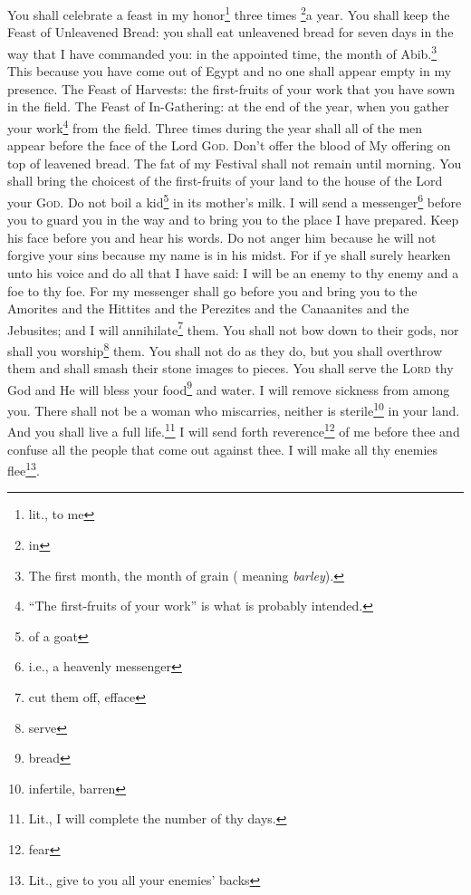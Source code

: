 \begin{enumerate*}[mode=unboxed]
     You shall celebrate a feast in my honor\footnote{lit., to me} three times \footnote{in}a year.%
     You shall keep the Feast of Unleavened Bread: you shall eat unleavened bread for seven days in the way that I have commanded you: in the appointed time, the month of Abib.\footnote{The first month, the month of grain ( meaning \textit{barley}).} This because you have come out of Egypt and no one shall appear empty in my presence.%
     The Feast of Harvests: the first-fruits of your work that you have sown in the field. The Feast of In-Gathering: at the end of the year, when you gather your work\footnote{``The first-fruits of your work'' is what is probably intended.} from the field.%
     Three times during the year shall all of the men appear before the face of the Lord \textsc{God}.%
     Don't offer the blood of My offering on top of leavened bread. The fat of my Festival shall not remain until morning.%
     You shall bring the choicest of the first-fruits of your land to the house of the Lord your \textsc{God}. Do not boil a kid\footnote{of a goat} in its mother's milk.%
     I will send a messenger\footnote{i.e., a heavenly messenger} before you to guard you in the way and to bring you to the place I have prepared.%
     Keep his face before you and hear his words. Do not anger him because he will not forgive your sins because my name is in his midst.%
     For if ye shall surely hearken unto his voice and do all that I have said: I will be an enemy to thy enemy and a foe to thy foe.%
     For my messenger shall go before you and bring you to the Amorites and the Hittites and the Perezites and the Canaanites and the Jebusites; and I will annihilate\footnote{cut them off, efface} them.%
     You shall not bow down to their gods, nor shall you worship\footnote{serve} them. You shall not do as they do, but you shall overthrow them and shall smash their stone images to pieces.%
     You shall serve the \textsc{Lord} thy God and He will bless your food\footnote{bread} and water. I will remove sickness from among you.%
     There shall not be a woman who miscarries, neither is sterile\footnote{infertile, barren} in your land. And you shall live a full life.\footnote{Lit., I will complete the number of thy days.}%
     I will send forth reverence\footnote{fear} of me before thee and confuse all the people that come out against thee. I will make all thy enemies flee\footnote{Lit., give to you all your enemies' backs}.%

\end{enumerate*}
